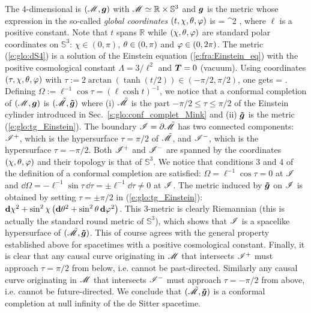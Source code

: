 \begin{example}
The 4-dimensional  is
$(\mathscr{M},\bm{g})$ with $\mathscr{M}\simeq \mathbb{R}\times\mathbb{S}^3$ and $\bm{g}$ is the metric
whose expression in the so-called \emph{global coordinates}
$(t,\chi,\theta,\varphi)$ is
\be \label{e:glo:dS4}
     = \ell^2  ,
\ee
where $\ell$ is a positive constant. Note that $t$ spans $\mathbb{R}$
while $(\chi,\theta,\varphi)$ are standard polar coordinates on $\mathbb{S}^3$:
$\chi\in(0,\pi)$, $\theta\in(0,\pi)$ and $\varphi\in(0,2\pi)$.
 The metric (\ref{e:glo:dS4}) is a solution
of the Einstein equation (\ref{e:fra:Einstein_eq}) with
the positive cosmological constant $\Lambda = 3/\ell^2$
and $\bm{T}=0$ (vacuum). Using coordinates $(\tau,\chi,\theta,\varphi)$ with
$\tau := 2\arctan(\tanh(t/2)) \in (-\pi/2,\pi/2)$, one gets
\be
     =   .
\ee
Defining $\Omega := \ell^{-1}\cos\tau = (\ell\cosh t)^{-1}$, we notice that
a conformal completion of $(\mathscr{M},\bm{g})$ is $(\tilde{\mathscr{M}},\bm{\tilde{g}})$
where (i) $\tilde{\mathscr{M}}$ is the part $-\pi/2\leq \tau \leq \pi/2$ of the Einstein cylinder
introduced in Sec.~\ref{s:glo:conf_complet_Mink}
and (ii)  $\bm{\tilde{g}}$ is the metric (\ref{e:glo:tg_Einstein}).
The boundary $\mathscr{I} = \partial\tilde{\mathscr{M}}$ has two connected components:
$\mathscr{I}^+$, which is the hypersurface $\tau = \pi/2$ of $\tilde{\mathscr{M}}$, and
$\mathscr{I}^-$, which is the hypersurface $\tau = -\pi/2$.
Both $\mathscr{I}^+$ and $\mathscr{I}^-$ are spanned by the coordinates $(\chi,\theta,\varphi)$
and their topology is that of $\mathbb{S}^3$.
We notice that conditions 3 and 4 of the definition of a conformal completion
are satisfied: $\Omega = \ell^{-1} \cos\tau = 0$ at $\mathscr{I}$ and
$\dd\Omega = - \ell^{-1} \sin\tau\, \dd\tau = \pm \ell^{-1} \dd\tau \not = 0 $
at $\mathscr{I}$.
The metric induced by $\bm{\tilde{g}}$ on $\mathscr{I}$ is obtained by
setting $\tau=\pm\pi/2$ in (\ref{e:glo:tg_Einstein}):
$\mathbf{d} \chi^2 + \sin^2\chi \left( \mathbf{d}\theta^2 + \sin^2\theta \, \mathbf{d}\varphi^2 \right) $.
This 3-metric is clearly Riemannian (this is actually the standard round metric
of $\mathbb{S}^3$), which shows that $\mathscr{I}$ is a spacelike
hypersurface of $(\tilde{\mathscr{M}},\bm{\tilde{g}})$. This of course agrees with
the general property established above for spacetimes with a positive
cosmological constant. Finally, it is clear that
any causal curve originating in $\mathscr{M}$ that intersects $\mathscr{I}^+$ must approach
$\tau=\pi/2$ from below, i.e. cannot be past-directed. Similarly any
causal curve originating in $\mathscr{M}$ that intersects $\mathscr{I}^-$ must approach
$\tau=-\pi/2$ from above, i.e. cannot be future-directed. We conclude
that $(\tilde{\mathscr{M}},\bm{\tilde{g}})$ is a conformal completion at null infinity
of the de Sitter spacetime.
\end{example}

